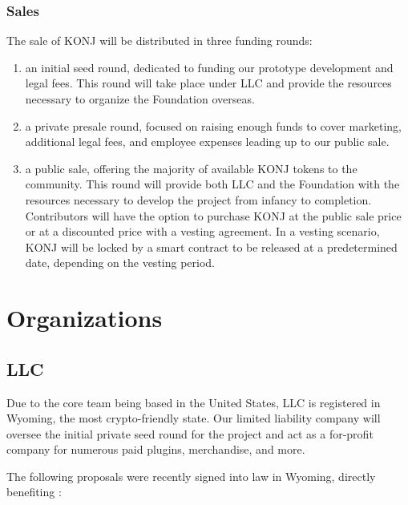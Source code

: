 \documentclass{kwp-builder}
\begin{document}
\subsubsection{Sales}

\tab The sale of KONJ will be distributed in three funding rounds:

\begin{enumerate}[label=(\alph*),leftmargin=2.5\parindent]
	\item an initial seed round, dedicated to funding our prototype development and legal fees. This round will take place under \konjure LLC and provide the resources necessary to organize the \konjure Foundation overseas.
	
	\item a private presale round, focused on raising enough funds to cover marketing, additional legal fees, and employee expenses leading up to our public sale.
	
	\item a public sale, offering the majority of available KONJ tokens to the community. This round will provide both \konjure LLC and the \konjure Foundation with the resources necessary to develop the project from infancy to completion. Contributors will have the option to purchase KONJ at the public sale price or at a discounted price with a vesting agreement. In a vesting scenario, KONJ will be locked by a smart contract to be released at a predetermined date, depending on the vesting period.
\end{enumerate}


\newpage

\section{Organizations}
\subsection{\konjure LLC}

\tab Due to the core \konjure team being based in the United States, \konjure LLC is registered in Wyoming, the most crypto-friendly state. Our limited liability company will oversee the initial private seed round for the project and act as a for-profit company for numerous paid plugins, merchandise, and more.\bigskip

The following proposals were recently signed into law in Wyoming, directly benefiting \konjure:
\end{document}
